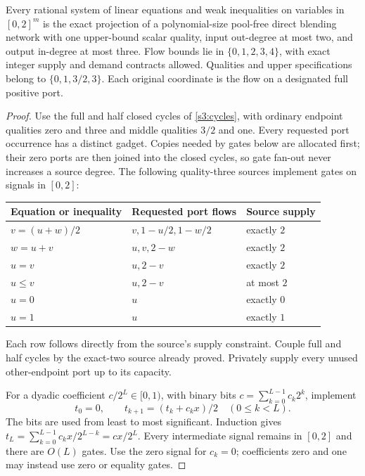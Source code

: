 \begin{lemma}\label{s3:linear-circuits}
Every rational system of linear equations and weak inequalities on
variables in $[0,2]^m$ is the exact
projection of a polynomial-size pool-free direct blending network with
one upper-bound scalar quality, input out-degree at most two, and output
in-degree at most three. Flow bounds lie in $\{0,1,2,3,4\}$, with exact
integer supply and demand contracts allowed. Qualities and upper
specifications belong to $\{0,1,3/2,3\}$. Each original coordinate
is the flow on a designated full positive port.
\end{lemma}
\begin{proof}
Use the full and half closed cycles of \cref{s3:cycles}, with ordinary
endpoint qualities zero and three and middle qualities $3/2$ and one.
Every requested port occurrence has a distinct gadget. Copies needed
by gates below are allocated first; their zero ports are then joined
into the closed cycles, so gate fan-out never increases a source degree.
The following
quality-three sources implement gates on signals in $[0,2]$:
\begin{center}
\begin{tabular}{lll}
\toprule
Equation or inequality & Requested port flows & Source supply\\
\midrule
$v=(u+w)/2$ & $v,1-u/2,1-w/2$ & exactly $2$\\
$w=u+v$ & $u,v,2-w$ & exactly $2$\\
$u=v$ & $u,2-v$ & exactly $2$\\
$u\le v$ & $u,2-v$ & at most $2$\\
$u=0$ & $u$ & exactly $0$\\
$u=1$ & $u$ & exactly $1$\\
\bottomrule
\end{tabular}
\end{center}
Each row follows directly from the source's supply constraint. Couple
full and half cycles by the exact-two source already proved. Privately
supply every unused other-endpoint port up to its capacity.

For a dyadic coefficient $c/2^L\in[0,1)$, with binary bits
$c=\sum_{k=0}^{L-1}c_k2^k$, implement
\begin{equation}
 t_0=0,\qquad t_{k+1}=(t_k+c_kx)/2\quad(0\le k<L).
 \label{s3:binary-multiplier}
\end{equation}
The bits are used from least to most significant. Induction gives
$t_L=\sum_{k=0}^{L-1}c_kx/2^{L-k}=cx/2^L$.
Every intermediate signal remains in $[0,2]$ and there are $O(L)$ gates.
Use the zero signal for $c_k=0$; coefficients zero and one may instead
use zero or equality gates.


\end{proof}
